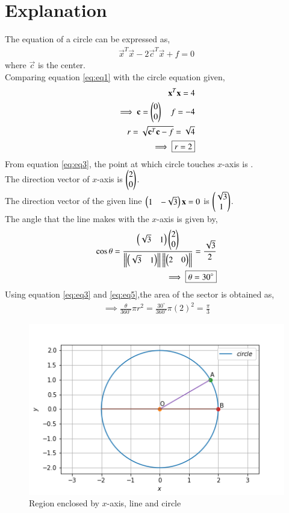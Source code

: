\documentclass[journal,12pt,twocolumn]{IEEEtran}
\begin{document}
\section{Explanation}
The equation of a circle can be expressed as,
\begin{align}
    \vec{x}^{T}\vec{x} - 2\vec{c}^{T}\vec{x} +f=0 \label{eq:eq1}
\end{align}
where $\vec{c}$ is the center.\\
Comparing equation \eqref{eq:eq1} with the circle equation given,
\begin{align}
    \mathbf{x}^{T}\mathbf{x} =4 \label{eq:eq2}\\
    \implies \mathbf{c} = \begin{pmatrix}0\\0\end{pmatrix} \quad f=-4\\
    r=\sqrt{\mathbf{c}^{T}\mathbf{c}-f} = \sqrt{4}\\
    \implies \boxed{r=2} \label{eq:eq3}
\end{align}
From equation \eqref{eq:eq3}, the point at which circle touches $x$-axis is .\\
The direction vector of $x$-axis is $\begin{pmatrix}2\\0\end{pmatrix}$.\\
The direction vector of the given line $\begin{pmatrix}1&-\sqrt{3}\end{pmatrix}\mathbf{x}=0$ is $\begin{pmatrix}\sqrt{3}\\1\end{pmatrix}$.\\
The angle that the line makes with the $x$-axis is given by,
\begin{align}
    \cos\theta = \frac{\begin{pmatrix}\sqrt{3}&1\end{pmatrix}\begin{pmatrix}2\\0\end{pmatrix}}{\left\lVert\begin{pmatrix}\sqrt{3}&1\end{pmatrix}\right\rVert\left\lVert\begin{pmatrix}2&0\end{pmatrix}\right\rVert}=\frac{\sqrt{3}}{2} \label{eq:eq4}\\
    \implies \boxed{\theta = 30^{\circ}}\label{eq:eq5}
\end{align}
Using equation \eqref{eq:eq3} and \eqref{eq:eq5},the area of the sector is obtained as,
\begin{align}
    \implies \boxed{\frac{\theta}{360^{\circ}}\pi r^2 = \frac{30^{\circ}}{360^{\circ}}\pi (2)^2=\frac{\pi}{3}} \label{eq:eq6}
\end{align}
\renewcommand{\thefigure}{\arabic{figure}}
\begin{figure}[h!]
	\centering
	\includegraphics[width=\columnwidth]{circle.png}
	\caption{Region enclosed by $x$-axis, line and circle}
	\label{myfig}
\end{figure}\\
\end{document}
